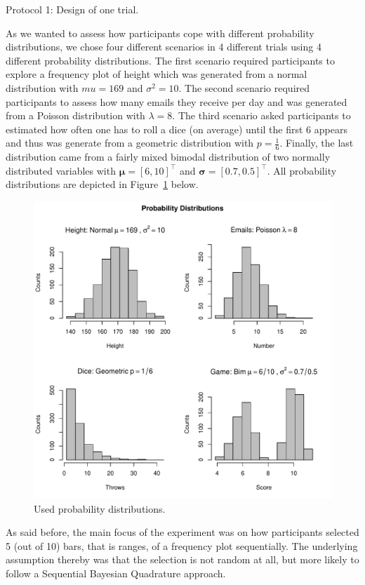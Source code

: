 \documentclass[oneside, 11pt]{book}
\begin{document}
\begin{center}Protocol 1: Design of one trial.\end{center}
As we wanted to assess how participants cope with different probability distributions, we chose four different scenarios in 4 different trials using 4 different probability distributions. The first scenario required participants to explore a frequency plot of height which was generated from a normal distribution with $mu=169$ and $\sigma^2=10$.  The second scenario required participants to assess how many emails they receive per day and was generated from a Poisson distribution with $\lambda=8$. The third scenario asked participants to estimated how often one has to roll a dice (on average) until the first 6 appears and thus was generate from a geometric distribution with $p=\frac{1}{6}$. Finally, the last distribution came from a fairly mixed bimodal distribution of two normally distributed variables with $\mathbf{\mu}=[6,10]^\top$ and $\mathbf{\sigma}=[0.7,0.5]^\top$. All probability distributions are depicted in Figure~\ref{dists} below.
\begin{figure}[h!]
\caption{Used probability distributions.}
\label{dists}
  \centering
    \includegraphics[scale=0.68]{probdists.pdf}
\end{figure}
As said before, the main focus of the experiment was on how participants selected 5 (out of 10) bars, that is ranges, of a frequency plot sequentially. The underlying assumption thereby was that the selection is not random at all, but more likely to follow a Sequential Bayesian Quadrature approach.\\
\end{document}

